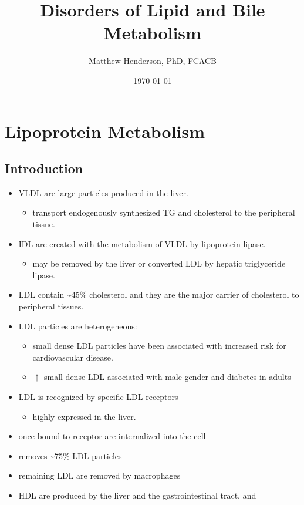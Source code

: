 \documentclass{scrartcl}
\author{Matthew Henderson, PhD, FCACB}
\date{\today}
\title{Disorders of Lipid and Bile Metabolism}
\begin{document}
\maketitle
\tableofcontents


\section{Lipoprotein Metabolism}
\label{sec:org7834530}
\subsection{Introduction}
\label{sec:orgd860997}
\begin{itemize}
\item VLDL are large particles produced in the liver.
\begin{itemize}
\item transport endogenously synthesized TG and cholesterol to the peripheral tissue.
\end{itemize}
\item IDL are created with the metabolism of VLDL by lipoprotein lipase.
\begin{itemize}
\item may be removed by the liver or converted LDL by hepatic triglyceride lipase.
\end{itemize}
\item LDL contain \textasciitilde{}45\% cholesterol and they are the major carrier of
cholesterol to peripheral tissues.
\item LDL particles are heterogeneous:
\begin{itemize}
\item small dense LDL particles have been associated with increased risk
for cardiovascular disease.
\item \(\uparrow\) small dense LDL associated with male gender and diabetes in adults
\end{itemize}
\item LDL is recognized by specific LDL receptors
\begin{itemize}
\item highly expressed in the liver.
\end{itemize}
\item once bound to receptor are internalized into the cell
\item removes \textasciitilde{}75\% LDL particles
\item remaining LDL are removed by macrophages
\item HDL are produced by the liver and the gastrointestinal tract, and

\end{itemize}
\end{document}
